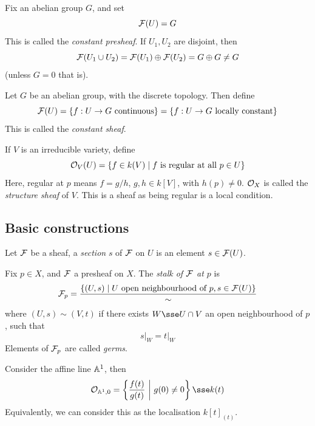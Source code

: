 \documentclass{article}
\begin{document}
\begin{example}
     Fix an abelian group \(G\), and set
    \[\mathcal{F}(U) = G\]
    This is called the \emph{constant presheaf}. If \(U_1, U_2\) are disjoint, then
    \[\mathcal{F}(U_1 \cup U_2) = \mathcal{F}(U_1) \oplus \mathcal{F}(U_2) = G \oplus G \ne G\]
    (unless \(G = 0\) that is).
\end{example}

\begin{example}
    Let \(G\) be an abelian group, with the discrete topology. Then define
    \[\mathcal{F}(U) = \left\{f : U \to G \text{ continuous}\right\} = \left\{f : U \to G \text{ locally constant}\right\}\]
    This is called the \emph{constant sheaf}.
\end{example}

\begin{example}
    If \(V\) is an irreducible variety, define
    \[\mathcal{O}_V(U) = \left\{f \in k(V) \mid f \text{ is regular at all }p \in U\right\}\]
    Here, regular at \(p\) means \(f = g/h\), \(g, h \in k[V]\), with \(h(p) \ne 0\). \(\mathcal{O}_X\) is called the \emph{structure sheaf} of \(V\). This is a sheaf as being regular is a local condition.
\end{example}

\subsection{Basic constructions}

\begin{definition}
    [section]
    Let \(\mathcal{F}\) be a sheaf, a \emph{section} \(s\) of \(\mathcal{F}\) on \(U\) is an element \(s \in \mathcal{F}(U)\).
\end{definition}

\begin{definition}
    [stalks] Fix \(p \in X\), and \(\mathcal{F}\) a presheaf on \(X\). The \emph{stalk of \(\mathcal{F}\) at \(p\)} is
    \[\mathcal{F}_p = \frac{\left\{(U, s) \mid U \text{ open neighbourhood of }p, s \in \mathcal{F}(U)\right\}}{\sim}\]
    where \((U, s) \sim (V, t)\) if there exists \(W \sse U \cap V\) an open neighbourhood of \(p\), such that
    \[s \vert_W = t\vert_W\]
    Elements of \(\mathcal{F}_p\) are called \emph{germs}.
\end{definition}

\begin{example}
    Consider the affine line \(\mathbb{A}^1\), then
    \[\mcO_{\bb A^1, 0} = \left\{\frac{f(t)}{g(t)} \ \bigg\vert\ g(0) \ne 0\right\} \sse k(t)\]
    Equivalently, we can consider this as the localisation \(k[t]_{(t)}\).
\end{example}
\end{document}
